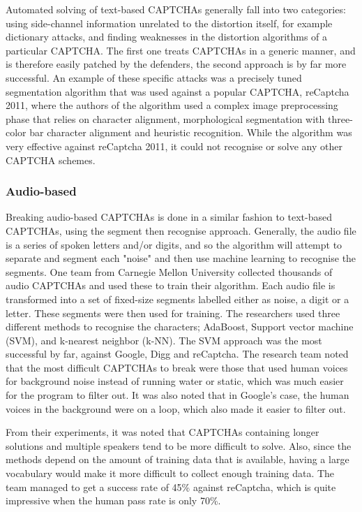 \documentclass[a4paper]{IEEEtran}
\begin{document}
Automated solving of text-based CAPTCHAs generally fall into two categories: using side-channel information unrelated to the distortion itself, for example dictionary attacks, and finding weaknesses in the distortion algorithms of a particular CAPTCHA. The first one treats CAPTCHAs in a generic manner, and is therefore easily patched by the defenders, the second approach is by far more successful. An example of these specific attacks was a precisely tuned segmentation algorithm that was used against a popular CAPTCHA, reCaptcha 2011, where the authors of the algorithm used a complex image preprocessing phase that relies on character alignment, morphological segmentation with three-color bar character alignment and heuristic recognition\cite{recaptcha2011}. While the algorithm was very effective against reCaptcha 2011, it could not recognise or solve any other CAPTCHA schemes. 

\subsubsection{Audio-based}
Breaking audio-based CAPTCHAs is done in a similar fashion to text-based CAPTCHAs, using the segment then recognise approach. Generally, the audio file is a series of spoken letters and/or digits, and so the algorithm will attempt to separate and segment each "noise" and then use machine learning to recognise the segments. One team from Carnegie Mellon University collected thousands of audio CAPTCHAs and used these to train their algorithm\cite{carnegie}. Each audio file is transformed into a set of fixed-size segments labelled either as noise, a digit or a letter. These segments were then used for training. The researchers used three different methods to recognise the characters; AdaBoost, Support vector machine (SVM), and k-nearest neighbor (k-NN). The SVM approach was the most successful by far, against Google, Digg and reCaptcha. The research team noted that the most difficult CAPTCHAs to break were those that used human voices for background noise instead of running water or static, which was much easier for the program to filter out. It was also noted that in Google's case, the human voices in the background were on a loop, which also made it easier to filter out.

From their experiments, it was noted that CAPTCHAs containing longer solutions and multiple speakers tend to be more difficult to solve. Also, since the methods depend on the amount of training data that is available, having a large vocabulary would make it more difficult to collect enough training data. The team managed to get a success rate of 45\% against reCaptcha, which is quite impressive when the human pass rate is only 70\%\cite{passrate}.
\end{document}
